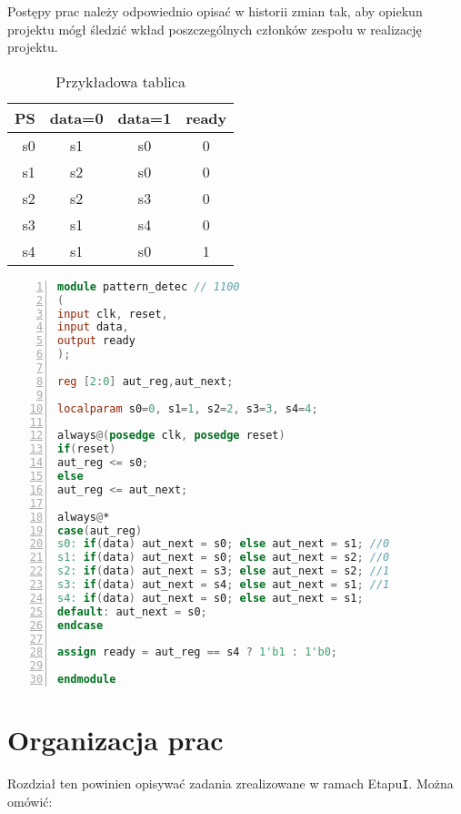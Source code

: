 \documentclass[a4paper,titleauthor]{mwart}
\begin{document}
Postępy prac należy odpowiednio opisać w historii zmian tak, aby opiekun projektu mógł śledzić wkład poszczególnych członków zespołu w realizację projektu.


\begin{table}[ht]
	\begin{center}
		\caption{Przykładowa tablica}
		\label{tab:tabela_prawdy}
		\begin{tabular}{|r||c|c||c|}
			\hline 
			PS & data=0 & data=1 & ready \\
			\hline \hline
			s0 & s1 & s0 & 0 \\
			s1 & s2 & s0 & 0 \\
			s2 & s2 & s3 & 0\\
			s3 & s1 & s4 & 0 \\ 
			s4 & s1 & s0 & 1 \\ 
			\hline
		\end{tabular}
	\end{center}
\end{table}

\begin{lstlisting}[label=lst:wydruk,caption={Przykładowy wydruk},language=Verilog,numbers=left]
module pattern_detec // 1100 
(	
input clk, reset,
input data,
output ready
);

reg [2:0] aut_reg,aut_next;

localparam s0=0, s1=1, s2=2, s3=3, s4=4;

always@(posedge clk, posedge reset)
if(reset)
aut_reg <= s0;
else
aut_reg <= aut_next;

always@*
case(aut_reg)
s0: if(data) aut_next = s0; else aut_next = s1; //0
s1: if(data) aut_next = s0; else aut_next = s2; //0
s2: if(data) aut_next = s3; else aut_next = s2; //1
s3: if(data) aut_next = s4; else aut_next = s1; //1
s4: if(data) aut_next = s0; else aut_next = s1;
default: aut_next = s0; 
endcase

assign ready = aut_reg == s4 ? 1'b1 : 1'b0;	

endmodule
\end{lstlisting}

	
\section{Organizacja prac}
\label{sec:organizacja}

Rozdział ten powinien opisywać zadania zrealizowane w ramach Etapu\texttt{I}. Można omówić:
\end{document}
